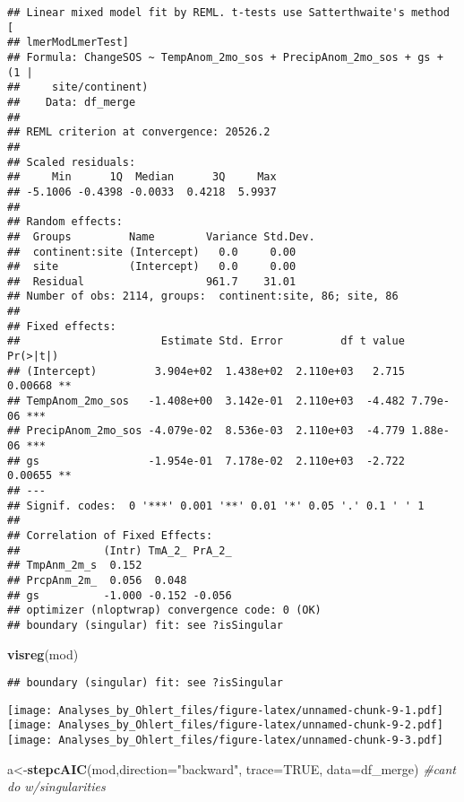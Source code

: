 \documentclass[
]{article}
\newenvironment{Shaded}{\begin{snugshade}}{\end{snugshade}}
\newcommand{\CommentTok}[1]{\textcolor[rgb]{0.56,0.35,0.01}{\textit{#1}}}
\newcommand{\DataTypeTok}[1]{\textcolor[rgb]{0.13,0.29,0.53}{#1}}
\newcommand{\KeywordTok}[1]{\textcolor[rgb]{0.13,0.29,0.53}{\textbf{#1}}}
\newcommand{\NormalTok}[1]{#1}
\newcommand{\OtherTok}[1]{\textcolor[rgb]{0.56,0.35,0.01}{#1}}
\newcommand{\StringTok}[1]{\textcolor[rgb]{0.31,0.60,0.02}{#1}}
\begin{document}
\begin{verbatim}
## Linear mixed model fit by REML. t-tests use Satterthwaite's method [
## lmerModLmerTest]
## Formula: ChangeSOS ~ TempAnom_2mo_sos + PrecipAnom_2mo_sos + gs + (1 |  
##     site/continent)
##    Data: df_merge
## 
## REML criterion at convergence: 20526.2
## 
## Scaled residuals: 
##     Min      1Q  Median      3Q     Max 
## -5.1006 -0.4398 -0.0033  0.4218  5.9937 
## 
## Random effects:
##  Groups         Name        Variance Std.Dev.
##  continent:site (Intercept)   0.0     0.00   
##  site           (Intercept)   0.0     0.00   
##  Residual                   961.7    31.01   
## Number of obs: 2114, groups:  continent:site, 86; site, 86
## 
## Fixed effects:
##                      Estimate Std. Error         df t value Pr(>|t|)    
## (Intercept)         3.904e+02  1.438e+02  2.110e+03   2.715  0.00668 ** 
## TempAnom_2mo_sos   -1.408e+00  3.142e-01  2.110e+03  -4.482 7.79e-06 ***
## PrecipAnom_2mo_sos -4.079e-02  8.536e-03  2.110e+03  -4.779 1.88e-06 ***
## gs                 -1.954e-01  7.178e-02  2.110e+03  -2.722  0.00655 ** 
## ---
## Signif. codes:  0 '***' 0.001 '**' 0.01 '*' 0.05 '.' 0.1 ' ' 1
## 
## Correlation of Fixed Effects:
##             (Intr) TmA_2_ PrA_2_
## TmpAnm_2m_s  0.152              
## PrcpAnm_2m_  0.056  0.048       
## gs          -1.000 -0.152 -0.056
## optimizer (nloptwrap) convergence code: 0 (OK)
## boundary (singular) fit: see ?isSingular
\end{verbatim}

\begin{Shaded}
\begin{Highlighting}[]
\KeywordTok{visreg}\NormalTok{(mod)}
\end{Highlighting}
\end{Shaded}

\begin{verbatim}
## boundary (singular) fit: see ?isSingular
\end{verbatim}

\texttt{[image: Analyses\_by\_Ohlert\_files/figure-latex/unnamed-chunk-9-1.pdf]}
\texttt{[image: Analyses\_by\_Ohlert\_files/figure-latex/unnamed-chunk-9-2.pdf]}
\texttt{[image: Analyses\_by\_Ohlert\_files/figure-latex/unnamed-chunk-9-3.pdf]}

\begin{Shaded}
\begin{Highlighting}[]
\NormalTok{a<-}\KeywordTok{stepcAIC}\NormalTok{(mod,}\DataTypeTok{direction=}\StringTok{"backward"}\NormalTok{, }\DataTypeTok{trace=}\OtherTok{TRUE}\NormalTok{, }\DataTypeTok{data=}\NormalTok{df_merge) }\CommentTok{#cant do w/singularities}
\end{Highlighting}
\end{Shaded}
\end{document}

